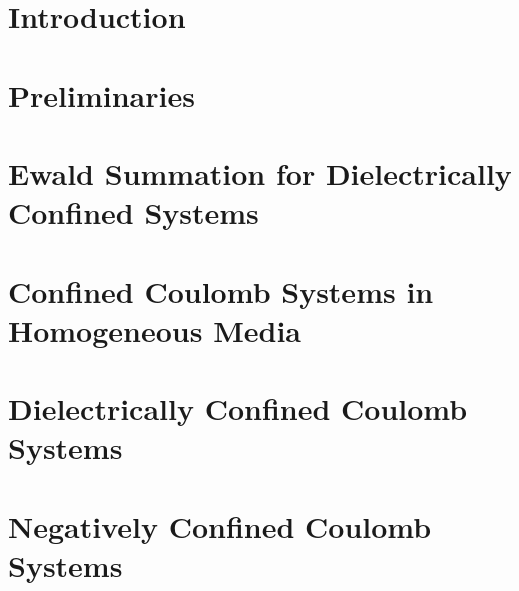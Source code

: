\documentclass[a4paper]{ustthesis}
\begin{document}


\chapter{Introduction}
\label{chp_intro}

\newpage

\chapter{Preliminaries}
\label{chp_preliminaries}

\newpage

\chapter{Ewald Summation for Dielectrically Confined Systems}
\label{chp_icmewald2d}

\newpage

\chapter{Confined Coulomb Systems in Homogeneous Media}
\label{chp_soewald2d}

\newpage

\chapter{Dielectrically Confined Coulomb Systems}
\label{chp_rbe2d}

\newpage

\chapter{Negatively Confined Coulomb Systems}
\label{chp_quasiewald}

\newpage
\end{document}
